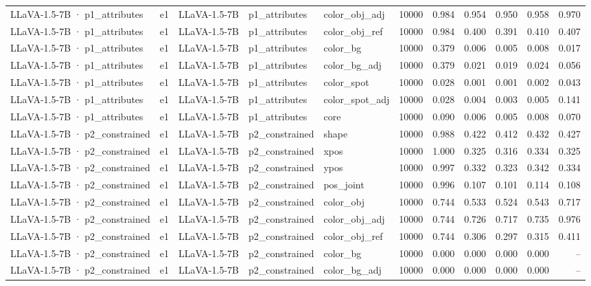 \begin{tabular}{lllllrrrrrr}
LLaVA-1.5-7B · p1\_attributes & e1 & LLaVA-1.5-7B & p1\_attributes & color\_obj\_adj & 10000 & 0.984 & 0.954 & 0.950 & 0.958 & 0.970 \\
LLaVA-1.5-7B · p1\_attributes & e1 & LLaVA-1.5-7B & p1\_attributes & color\_obj\_ref & 10000 & 0.984 & 0.400 & 0.391 & 0.410 & 0.407 \\
LLaVA-1.5-7B · p1\_attributes & e1 & LLaVA-1.5-7B & p1\_attributes & color\_bg & 10000 & 0.379 & 0.006 & 0.005 & 0.008 & 0.017 \\
LLaVA-1.5-7B · p1\_attributes & e1 & LLaVA-1.5-7B & p1\_attributes & color\_bg\_adj & 10000 & 0.379 & 0.021 & 0.019 & 0.024 & 0.056 \\
LLaVA-1.5-7B · p1\_attributes & e1 & LLaVA-1.5-7B & p1\_attributes & color\_spot & 10000 & 0.028 & 0.001 & 0.001 & 0.002 & 0.043 \\
LLaVA-1.5-7B · p1\_attributes & e1 & LLaVA-1.5-7B & p1\_attributes & color\_spot\_adj & 10000 & 0.028 & 0.004 & 0.003 & 0.005 & 0.141 \\
LLaVA-1.5-7B · p1\_attributes & e1 & LLaVA-1.5-7B & p1\_attributes & core & 10000 & 0.090 & 0.006 & 0.005 & 0.008 & 0.070 \\
LLaVA-1.5-7B · p2\_constrained & e1 & LLaVA-1.5-7B & p2\_constrained & shape & 10000 & 0.988 & 0.422 & 0.412 & 0.432 & 0.427 \\
LLaVA-1.5-7B · p2\_constrained & e1 & LLaVA-1.5-7B & p2\_constrained & xpos & 10000 & 1.000 & 0.325 & 0.316 & 0.334 & 0.325 \\
LLaVA-1.5-7B · p2\_constrained & e1 & LLaVA-1.5-7B & p2\_constrained & ypos & 10000 & 0.997 & 0.332 & 0.323 & 0.342 & 0.334 \\
LLaVA-1.5-7B · p2\_constrained & e1 & LLaVA-1.5-7B & p2\_constrained & pos\_joint & 10000 & 0.996 & 0.107 & 0.101 & 0.114 & 0.108 \\
LLaVA-1.5-7B · p2\_constrained & e1 & LLaVA-1.5-7B & p2\_constrained & color\_obj & 10000 & 0.744 & 0.533 & 0.524 & 0.543 & 0.717 \\
LLaVA-1.5-7B · p2\_constrained & e1 & LLaVA-1.5-7B & p2\_constrained & color\_obj\_adj & 10000 & 0.744 & 0.726 & 0.717 & 0.735 & 0.976 \\
LLaVA-1.5-7B · p2\_constrained & e1 & LLaVA-1.5-7B & p2\_constrained & color\_obj\_ref & 10000 & 0.744 & 0.306 & 0.297 & 0.315 & 0.411 \\
LLaVA-1.5-7B · p2\_constrained & e1 & LLaVA-1.5-7B & p2\_constrained & color\_bg & 10000 & 0.000 & 0.000 & 0.000 & 0.000 & -- \\
LLaVA-1.5-7B · p2\_constrained & e1 & LLaVA-1.5-7B & p2\_constrained & color\_bg\_adj & 10000 & 0.000 & 0.000 & 0.000 & 0.000 & -- \\

\end{tabular}
